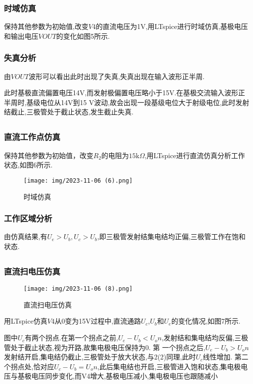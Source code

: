 \documentclass[12pt, a4paper, oneside]{ctexart}
\begin{document}
        \subsubsection{时域仿真}
        
        保持其他参数为初始值,改变$V4$的直流电压为1V,用LTspice进行时域仿真,基极电压和输出电压$VOUT$的变化如图5所示.
        \subsubsection{失真分析}
        由$VOUT$波形可以看出此时出现了失真,失真出现在输入波形正半周.

        此时基极直流偏置电压14V,而发射极偏置电压略小于15V.在基极交流输入波形正半周时,基级电位从14V到15
        V波动,故会出现一段基级电位大于射级电位,此时发射结截止,三极管处于截止状态,发生截止失真.
        \subsection{}
        \subsubsection{直流工作点仿真}
        保持其他参数为初始值，改变$R_2$的电阻为$15\text{k}\Omega$,用LTspice进行直流仿真分析工作状态,如图6所示.
        \begin{figure}[h]
            \centering
            \texttt{[image: img/2023-11-06 (6).png]}
            \caption{时域仿真}
        \end{figure}

        \subsubsection{工作区域分析}
        由仿真结果,有$U_e>U_b,U_c>U_b$,即三极管发射结集电结均正偏,三极管工作在饱和状态.
        
        \subsection{}
        \subsubsection{直流扫电压仿真}
        \begin{figure}[h]
            \centering
            \texttt{[image: img/2023-11-06 (8).png]}
            \caption{直流扫电压仿真}
        \end{figure}
        用LTspice仿真$V4$从0变为15V过程中,直流通路$U_c$,$U_b$和$U_e$的变化情况,如图7所示.
        
        图中$U_c$有两个拐点.在第一个拐点之前,$U_e-U_b<U_on$,发射结和集电结均反偏,三极管处于截止状态,视为开路,故集电极电压保持为0.
        第 一个拐点之后,$U_e-U_b>U_on$发射结开启,集电结仍截止,三极管处于放大状态,与2(2)同理,此时$U_c$线性增加.
        第二个拐点处,恰对应$U_c-U_b=U_on$,此后集电结也开启,三极管进入饱和状态,集电极电压与基极电压同步变化,而V4增大,基极电压减小,集电极电压也跟随减小
\end{document}

